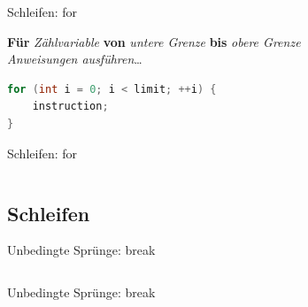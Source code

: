 \documentclass[18pt]{beamer}
\begin{document}
\begin{frame}[fragile]{Schleifen: for}
    \begin{block}{}
        \textbf{Für} \textit{Zählvariable} \textbf{von} \textit{untere Grenze} \textbf{bis} \textit{obere Grenze}\\
        \textit{Anweisungen ausführen}\dots
    \end{block}
    \pause

    \begin{block}{}
        \begin{lstlisting}[language=Java]
for (int i = 0; i < limit; ++i) {
    instruction;
}
        \end{lstlisting}
    \end{block}
\end{frame}

\begin{frame}[fragile]{Schleifen: for}
    \begin{exampleblock}{}
    \begin{lstlisting}[language=Java]

    \end{lstlisting}
    \end{exampleblock}
\end{frame}

\subsection{Schleifen}

\begin{frame}[fragile]{Unbedingte Sprünge: break}
    \begin{block}{}

    \end{block}
    \pause

    \begin{block}{}
        \begin{lstlisting}[language=Java]

        \end{lstlisting}
    \end{block}
\end{frame}

\begin{frame}[fragile]{Unbedingte Sprünge: break}
    \begin{exampleblock}{}
    \begin{lstlisting}[language=Java]

    \end{lstlisting}
    \end{exampleblock}
\end{frame}
\end{document}
